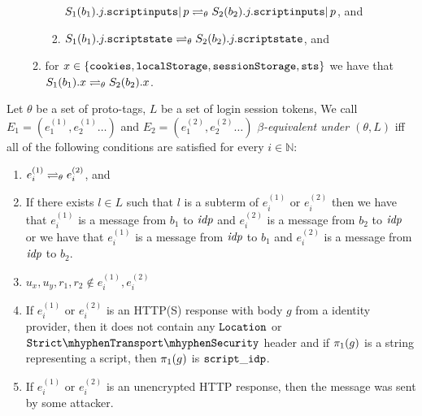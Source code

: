 \begin{definition}
\begin{enumerate}
\begin{enumerate}
\begin{enumerate}
          $S_1(b_1).j.\mathtt{scriptinputs} |\, p \rightleftharpoons_{\theta}
          S_2(b_2).j.\mathtt{scriptinputs} |\, p$, and
        \item\label{eqs:rp:b:w:script}
          $S_1(b_1).j.\mathtt{scriptstate} \rightleftharpoons_{\theta}
          S_2(b_2).j.\mathtt{scriptstate}$, and 
        \end{enumerate}
      \item\label{eqs:b:misc} for
        $x \in \{\mathtt{cookies},\mathtt{localStorage},\mathtt{sessionStorage},\mathtt{sts}\}$
        we have that $S_1(b_1).x \rightleftharpoons_{\theta} S_2(b_2).x$.
      \end{enumerate}
    \end{enumerate}
  \end{definition}
  
  \begin{definition}\label{def:rp:Events}
    Let $\theta$ be a set of proto-tags, 
    $L$ be a set of login session tokens, 
    We call $E_1 = (e_1^{(1)}, e_2^{(1)}\dots)$ and
    $E_2= (e_1^{(2)}, e_2^{(2)} \dots)$ 
    \emph{$\beta$-equivalent under $(\theta, L)$} 
    iff all of the following conditions are satisfied for every 
    $i \in \mathbb{N}$:
  
    \begin{enumerate}
      \item\label{eqe:rp:distinction} 
        $e_i^{(1)} \rightleftharpoons_{\theta} e_i^{(2)}$, and
      \item\label{eqe:rp:pre:l} If there exists $l \in L$ such that $l$ is a
        subterm of $e_i^{(1)}$ or $e_i^{(2)}$ then we have that
        $e_i^{(1)}$ is a message from $b_1$ to $\mathit{idp}$ and $e_i^{(2)}$ is a
        message from $b_2$ to $\mathit{idp}$ or we have that $e_i^{(1)}$ is a
        message from $\mathit{idp}$ to $b_1$ and $e_i^{(2)}$ is a message from
        $\mathit{idp}$ to $b_2$.
      \item\label{eqe:rp:pre:t} $u_x, u_y, r_1, r_2 \not\in e_i^{(1)}, e_i^{(2)}$
      \item\label{eqe:rp:pre:rp-scripts} If $e_i^{(1)}$ or $e_i^{(2)}$ is an
        HTTP(S) response with body $g$ from a identity provider, then it does
        not contain any $\mathtt{Location}$ or $\cSTS$ header
        and if $\pi_{1}({g})$ is a string representing a script, then
        $\pi_{1}({g})$ is $\mathtt{script\_idp}$.
      \item\label{eqe:rp:pre:unencrypted-http} 
        If $e_i^{(1)}$ or $e_i^{(2)}$ is an unencrypted HTTP 
        response, then the message was sent by some attacker.
    \end{enumerate}
  \end{definition}
  
